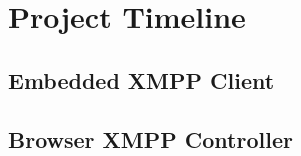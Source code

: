 \section{Project Timeline}

\subsection{Embedded XMPP Client}
\subsection{Browser XMPP Controller}


